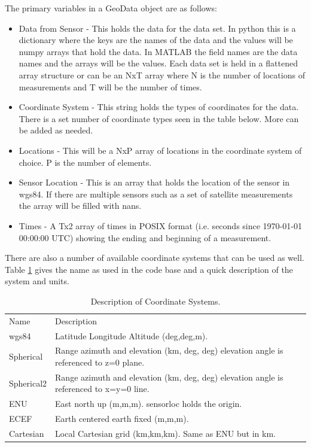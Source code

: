 The primary variables in a GeoData object are as follows: 
\begin{itemize} 
\item Data from Sensor - This holds the data for the data set. In python this is a dictionary where the keys are the names of the data and the values will be numpy arrays that hold the data. In MATLAB the field names are the data names and the arrays will be the values. Each data set is held in a flattened array structure or can be an NxT array where N is the number of locations of measurements and T will be the number of times.
\item Coordinate System - This string holds the types of coordinates for the data. There is a set number of coordinate types seen in the table below. More can be added as needed.
\item Locations - This will be a NxP array of locations in the coordinate system of choice. P is the number of elements.
\item Sensor Location - This is an array that holds the location of the sensor in wgs84. If there are multiple sensors such as a set of satellite measurements the array will be filled with nans.
\item Times - A Tx2 array of times in POSIX format (i.e. seconds since 1970-01-01 00:00:00 UTC) showing the ending and beginning of a measurement.
\end{itemize}

There are also a number of available coordinate systems that can be used as well. Table \ref{tab:coord} gives the name as used in the code base and a quick description of the system and units.

\begin{table}[]
\centering
\caption{Description of Coordinate Systems.}
\label{tab:coord}
\begin{tabular}{p{1in}p{4in}}
Name       & Description                                                                            \\
wgs84      & Latitude Longitude Altitude (deg,deg,m).                                                \\
Spherical  & Range azimuth and elevation (km, deg, deg) elevation angle is referenced to z=0 plane.  \\
Spherical2 & Range azimuth and elevation (km, deg, deg) elevation angle is referenced to x=y=0 line. \\
ENU        & East north up (m,m,m). sensorloc holds the origin.                                      \\
ECEF       & Earth centered earth fixed (m,m,m).                                                     \\
Cartesian  & Local Cartesian grid (km,km,km). Same as ENU but in km.                
\end{tabular}
\end{table}


